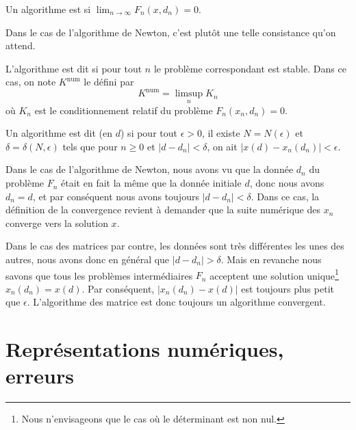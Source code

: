 \begin{definition}
	Un algorithme est  si $\lim_{n\to\infty}F_n(x,d_n)=0$.
\end{definition}
Dans le cas de l'algorithme de Newton, c'est plutôt une telle consistance qu'on attend.

L'algorithme est dit  si pour tout $n$ le problème correspondant est stable.  Dans ce cas, on note $K^{\mbox{num}}$ le   défini par
\begin{equation}
	K^{\mbox{num}}=\limsup_nK_n
\end{equation}
où $K_n$ est le conditionnement relatif du problème $F_n(x_n,d_n)=0$.

\begin{definition}      \label{DefAlgoConverge}
	Un algorithme est dit  (en $d$) si pour tout $\epsilon>0$, il existe $N=N(\epsilon)$ et $\delta=\delta(N,\epsilon)$ tels que pour $n\geq0$ et $|d-d_n|<\delta$, on ait $|x(d)-x_n(d_n)|<\epsilon$.
\end{definition}

\begin{remark}      \label{RemConvAlgoNewton}
Dans le cas de l'algorithme de Newton, nous avons vu que la donnée $d_n$ du problème $F_n$ était en fait la même que la donnée initiale $d$, donc nous avons $d_n=d$, et par conséquent nous avons toujours $| d-d_n |<\delta$. Dans ce cas, la définition de la convergence revient à demander que la suite numérique des $x_n$ converge vers la solution $x$.
\end{remark}

\begin{remark}
Dans le cas des matrices par contre, les données sont très différentes les unes des autres, nous avons donc en général que $| d-d_n |>\delta$. Mais en revanche nous savons que tous les problèmes intermédiaires $F_n$ acceptent une solution unique\footnote{Nous n'envisageons que le cas où le déterminant est non nul.} $x_n(d_n)=x(d)$. Par conséquent, $| x_n(d_n)-x(d) |$ est toujours plus petit que $\epsilon$. L'algorithme des matrice est donc toujours un algorithme convergent.
\end{remark}

\section{Représentations numériques, erreurs}

